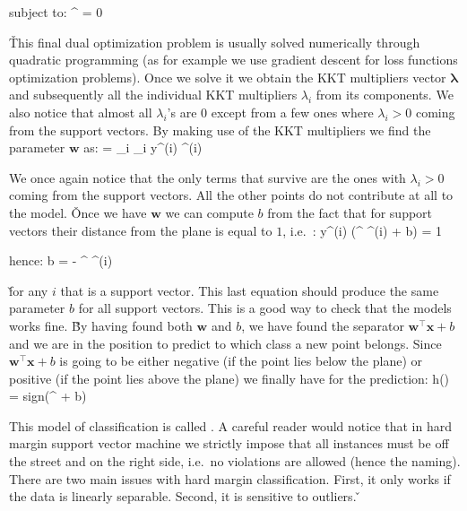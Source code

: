 subject to:
\bse
\boldsymbol{\lambda}  \qquad {} \qquad {}^\intercal \boldsymbol{\lambda} = 0
\ese

\v

This final dual optimization problem is usually solved numerically through quadratic programming (as for example we
use gradient descent for loss functions optimization problems). Once we solve it we obtain the KKT multipliers vector
$\boldsymbol{\lambda}$ and subsequently all the individual KKT multipliers $\lambda_{i}$ from its components. We also
notice that almost all $\lambda_{i}$'s are $0$ except from a few ones where $\lambda_{i} > 0$ coming from the support
vectors. By making use of the KKT multipliers we find the parameter $\boldsymbol{w}$ as:
\bse
{} = \sum_{i} \lambda_{i} y^{(i)} ^{(i)}
\ese

We once again notice that the only terms that survive are the ones with $\lambda_{i} > 0$ coming from the support
vectors. All the other points do not contribute at all to the model. \v

Once we have $\boldsymbol{w}$ we can compute $b$ from the fact that for support vectors their distance from the plane
is equal to $1$, i.e.\ :
\bse
y^{(i)} (^{\intercal} ^{(i)} + b) = 1
\ese

hence:
\bse
b =  - ^{\intercal} ^{(i)}
\ese

\v

for any $i$ that is a support vector. This last equation should produce the same parameter $b$ for all support
vectors. This is a good way to check that the models works fine. \v

By having found both $\boldsymbol{w}$ and $b$, we have found the separator $\boldsymbol{w}^{\intercal} \boldsymbol{x}
+ b$ and we are in the position to predict to which class a new point belongs. Since $\boldsymbol{w}^{\intercal}
\boldsymbol{x} + b$ is going to be either negative (if the point lies below the plane) or positive (if the point lies
above the plane) we finally have for the prediction:
\bse
h() = sign(^{\intercal}  + b)
\ese

This model of classification is called . A careful reader would notice that
in hard margin support vector machine we strictly impose that all instances must be off the street and on the right
side, i.e.\ no violations are allowed (hence the naming). There are two main issues with hard margin classification.
First, it only works if the data is linearly separable. Second, it is sensitive to outliers. \v


